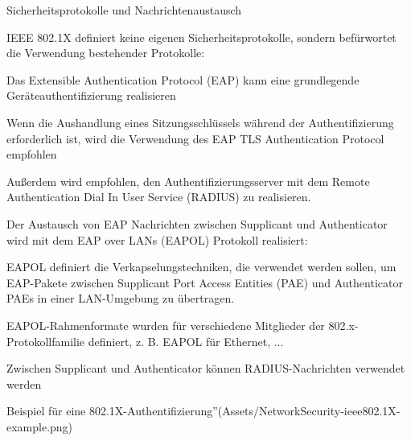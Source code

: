 \documentclass[a4paper]{article}
\begin{document}
\begin{multicols}{3}
      Sicherheitsprotokolle und Nachrichtenaustausch
      \begin{itemize*}
            \item IEEE 802.1X definiert keine eigenen Sicherheitsprotokolle, sondern befürwortet die Verwendung bestehender Protokolle:
            \begin{itemize*}
                  \item Das Extensible Authentication Protocol (EAP) kann eine grundlegende Geräteauthentifizierung realisieren
                  \item Wenn die Aushandlung eines Sitzungsschlüssels während der Authentifizierung erforderlich ist, wird die Verwendung des EAP TLS Authentication Protocol empfohlen
                  \item Außerdem wird empfohlen, den Authentifizierungsserver mit dem Remote Authentication Dial In User Service (RADIUS) zu realisieren.
            \end{itemize*}
            \item Der Austausch von EAP Nachrichten zwischen Supplicant und Authenticator wird mit dem EAP over LANs (EAPOL) Protokoll realisiert:
            \begin{itemize*}
                  \item EAPOL definiert die Verkapselungstechniken, die verwendet werden sollen, um EAP-Pakete zwischen Supplicant Port Access Entities (PAE) und Authenticator PAEs in einer LAN-Umgebung zu übertragen.
                  \item EAPOL-Rahmenformate wurden für verschiedene Mitglieder der 802.x-Protokollfamilie definiert, z. B. EAPOL für Ethernet, ...
                  \item Zwischen Supplicant und Authenticator können RADIUS-Nachrichten verwendet werden
            \end{itemize*}
      \end{itemize*}

      Beispiel für eine 802.1X-Authentifizierung''(Assets/NetworkSecurity-ieee802.1X-example.png)

\end{multicols}
\end{document}
